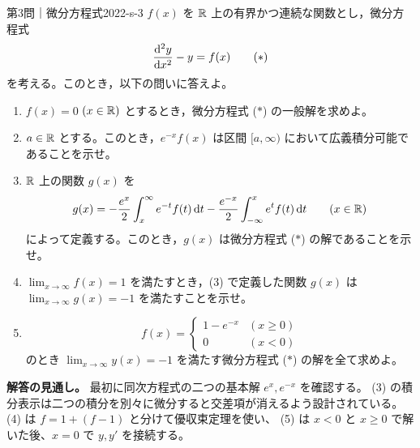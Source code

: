 \begin{problem}{第3問｜微分方程式}{2022-s-3}
$f(x)$ を $\mathbb{R}$ 上の有界かつ連続な関数とし，微分方程式
\[
\frac{\mathrm{d}^2y}{\mathrm{d} x^2}-y=f(x)
\tag{$*$}
\]
を考える。このとき，以下の問いに答えよ。
\begin{enumerate}
  \item[(1)] $f(x)=0$ $(x\in\mathbb{R})$ とするとき，微分方程式 ($*$) の一般解を求めよ。
  \item[(2)] $a\in\mathbb{R}$ とする。このとき，$e^{-x}f(x)$ は区間 $[a,\infty)$ において広義積分可能であることを示せ。
  \item[(3)] $\mathbb{R}$ 上の関数 $g(x)$ を
  \[
  g(x)=-\frac{e^x}2\int_x^\infty e^{-t}f(t)\,\mathrm{d} t
  -\frac{e^{-x}}2\int_{-\infty}^xe^tf(t)\,\mathrm{d} t
  \qquad(x\in\mathbb{R})
  \]
  によって定義する。このとき，$g(x)$ は微分方程式 ($*$) の解であることを示せ。
  \item[(4)] $\displaystyle\lim_{x\to\infty}f(x)=1$ を満たすとき，(3) で定義した関数 $g(x)$ は $\displaystyle\lim_{x\to\infty}g(x)=-1$ を満たすことを示せ。
  \item[(5)] 
  \[
  f(x)=\begin{cases}1-e^{-x}&(x\ge0)\\0&(x<0)\end{cases}
  \]
  のとき $\displaystyle\lim_{x\to\infty}y(x)=-1$ を満たす微分方程式 ($*$) の解を全て求めよ。
\end{enumerate}
\end{problem}
\begin{memo*}
\textbf{解答の見通し。}
最初に同次方程式の二つの基本解 $e^x,e^{-x}$ を確認する。
(3) の積分表示は二つの積分を別々に微分すると交差項が消えるよう設計されている。
(4) は $f=1+(f-1)$ と分けて優収束定理を使い、
(5) は $x<0$ と $x\ge0$ で解いた後、$x=0$ で $y,y'$ を接続する。
\end{memo*}
